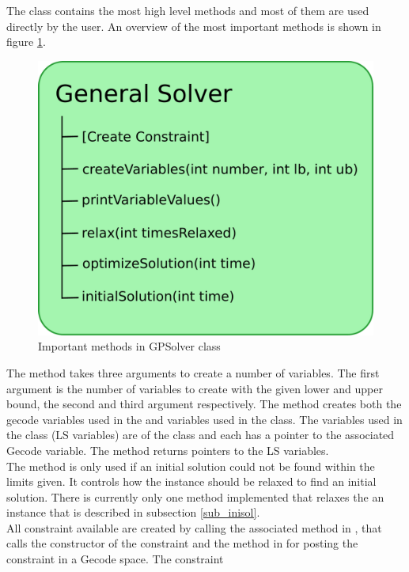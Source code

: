The \gensol class contains the most high level methods and most of them are used directly by the user. An overview of 
the most important methods is shown in figure \ref{fig_general}. \\ \noindent
\begin{figure}[!b] 
\begin{center}
\includegraphics[width=0.8\linewidth]{general2.pdf} \caption{Important methods in GPSolver class} 
\label{fig_general}
\end{center} 
\end{figure} 
The method  takes three arguments to create a number of variables. The first argument 
is the number of variables to create with the given lower and upper bound, the second and third argument respectively. 
The method creates both the gecode variables used in the  and variables used in the 
 class. The variables used in the  class (LS variables) are of the 
class 
 and each has a pointer to the associated Gecode variable. The method returns pointers to the LS 
variables. \\ 
The method  is only used if an initial solution could not be found within the limits given. It controls 
how the instance should be relaxed to find an initial solution. There is currently only one method implemented that 
relaxes the an instance that is described in subsection \ref{sub_inisol}. \\
All constraint available are created by calling the associated method in \gensol, that calls the constructor 
of the constraint and the method in  for posting the constraint in a Gecode space. The constraint 
